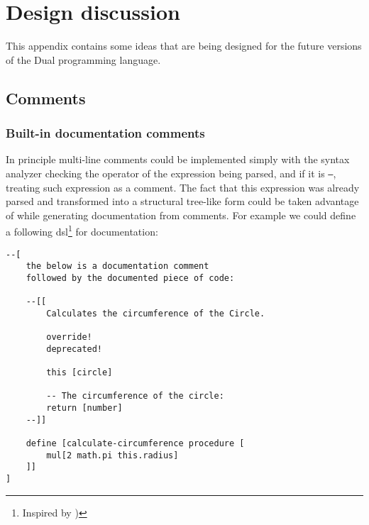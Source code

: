 \chapter{Design discussion}\label{app:design}
This appendix contains some ideas that are being designed for the future versions of the Dual programming language.

\section{Comments}\label{sec:comments}
\subsection{Built-in documentation comments}
In principle multi-line comments could be implemented simply with the syntax
analyzer checking the operator of the expression being parsed, and if it is
\texttt{--}, treating such expression as a comment. The fact that this
expression was already parsed and transformed into a structural tree-like form
could be taken advantage of while generating documentation from comments. For
example we could define a following \acrlong{dsl}\footnote{Inspired by \cite{jsdoc_wikipedia})} for documentation:
\begin{lstlisting}
--[
    the below is a documentation comment
    followed by the documented piece of code:
    
    --[[
        Calculates the circumference of the Circle.
        
        override!
        deprecated!
        
        this [circle]
        
        -- The circumference of the circle: 
        return [number]
    --]]
        
    define [calculate-circumference procedure [
        mul[2 math.pi this.radius]
    ]]
]
\end{lstlisting}

